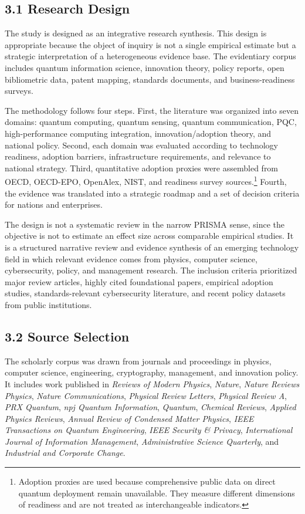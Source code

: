 \documentclass[
  11pt,
  letterpaper,
]{article}
\begin{document}
\subsection{3.1 Research Design}\label{research-design}

The study is designed as an integrative research synthesis. This design
is appropriate because the object of inquiry is not a single empirical
estimate but a strategic interpretation of a heterogeneous evidence
base. The evidentiary corpus includes quantum information science,
innovation theory, policy reports, open bibliometric data, patent
mapping, standards documents, and business-readiness surveys.

The methodology follows four steps. First, the literature was organized
into seven domains: quantum computing, quantum sensing, quantum
communication, PQC, high-performance computing integration,
innovation/adoption theory, and national policy. Second, each domain was
evaluated according to technology readiness, adoption barriers,
infrastructure requirements, and relevance to national strategy. Third,
quantitative adoption proxies were assembled from OECD, OECD-EPO,
OpenAlex, NIST, and readiness survey sources.\footnote{Adoption proxies
  are used because comprehensive public data on direct quantum
  deployment remain unavailable. They measure different dimensions of
  readiness and are not treated as interchangeable indicators.} Fourth,
the evidence was translated into a strategic roadmap and a set of
decision criteria for nations and enterprises.

The design is not a systematic review in the narrow PRISMA sense, since
the objective is not to estimate an effect size across comparable
empirical studies. It is a structured narrative review and evidence
synthesis of an emerging technology field in which relevant evidence
comes from physics, computer science, cybersecurity, policy, and
management research. The inclusion criteria prioritized major review
articles, highly cited foundational papers, empirical adoption studies,
standards-relevant cybersecurity literature, and recent policy datasets
from public institutions.

\subsection{3.2 Source Selection}\label{source-selection}

The scholarly corpus was drawn from journals and proceedings in physics,
computer science, engineering, cryptography, management, and innovation
policy. It includes work published in \emph{Reviews of Modern Physics},
\emph{Nature}, \emph{Nature Reviews Physics}, \emph{Nature
Communications}, \emph{Physical Review Letters}, \emph{Physical Review
A}, \emph{PRX Quantum}, \emph{npj Quantum Information}, \emph{Quantum},
\emph{Chemical Reviews}, \emph{Applied Physics Reviews}, \emph{Annual
Review of Condensed Matter Physics}, \emph{IEEE Transactions on Quantum
Engineering}, \emph{IEEE Security \& Privacy}, \emph{International
Journal of Information Management}, \emph{Administrative Science
Quarterly}, and \emph{Industrial and Corporate Change}.
\end{document}
